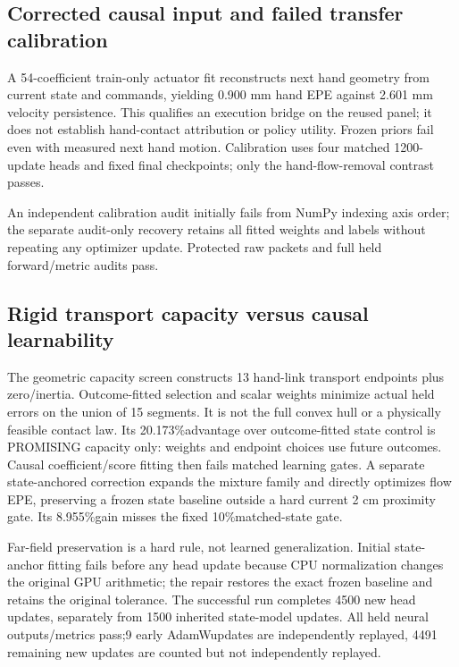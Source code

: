 \documentclass[10pt]{article}
\begin{document}
\subsection{Corrected causal input and failed transfer calibration}
A 54-coefficient train-only actuator fit reconstructs next hand geometry from
current state and commands, yielding 0.900 mm hand EPE against 2.601 mm velocity
persistence. This qualifies an execution bridge on the reused panel; it does
not establish hand-contact attribution or policy utility. Frozen priors fail
even with measured next hand motion. Calibration uses four matched 1200-update
heads and fixed final checkpoints; only the hand-flow-removal contrast passes.
\begin{table}[ht]\centering

\caption{Corrected-panel object-flow EPE(mm),6144 windows/384 held episodes.
Oracle rows use realized future hand motion and are nondeployable. Calibration
and frozen-prior variants are different models, not one ablation matrix.}
\end{table}
An independent calibration audit initially fails from NumPy indexing axis
order; the separate audit-only recovery retains all fitted weights and labels
without repeating any optimizer update. Protected raw packets and full held
forward/metric audits pass.

\clearpage
\subsection{Rigid transport capacity versus causal learnability}
The geometric capacity screen constructs 13 hand-link transport endpoints plus
zero/inertia. Outcome-fitted selection and scalar weights minimize actual
held errors on the union of 15 segments. It is not the full convex hull or a
physically feasible contact law. Its 20.173\%advantage over outcome-fitted state
control is PROMISING capacity only: weights and endpoint choices use future
outcomes. Causal coefficient/score fitting then fails matched learning gates.
A separate state-anchored correction expands the mixture family and directly
optimizes flow EPE, preserving a frozen state baseline outside a hard current
2 cm proximity gate. Its 8.955\%gain misses the fixed 10\%matched-state gate.
\begin{table}[ht]\centering\small

\caption{Different transport families, equal-episode EPE(mm) on corrected held
data. Each row has its own matched state control. The first row is an oracle;
it must not be read as a deployable winner over the learned rows.}
\end{table}
Far-field preservation is a hard rule, not learned generalization. Initial
state-anchor fitting fails before any head update because CPU normalization
changes the original GPU arithmetic; the repair restores the exact frozen
baseline and retains the original tolerance. The successful run completes
4500 new head updates, separately from 1500 inherited state-model updates. All held
neural outputs/metrics pass;9 early AdamWupdates are independently replayed,
4491 remaining new updates are counted but not independently replayed.
\end{document}

